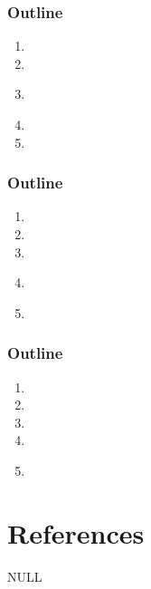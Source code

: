 \documentclass[usenames,dvipsnames]{beamer}
\begin{document}


\miniframesoff
\begin{frame}
  \frametitle{\textbf{ Outline}}
\begin{enumerate}
  \item \introtitle
  \item \firsttitle
  \item \textbf{\secondtitle}
  \item \thirdtitle
  \item \conclusiontitle
\end{enumerate}
\end{frame}
\miniframeson



\miniframesoff
\begin{frame}
  \frametitle{\textbf{ Outline}}
\begin{enumerate}
  \item \introtitle
  \item \firsttitle
  \item \secondtitle
  \item \textbf{\thirdtitle}
  \item \conclusiontitle
\end{enumerate}
\end{frame}
\miniframeson



\miniframesoff
\begin{frame}
  \frametitle{\textbf{ Outline}}
\begin{enumerate}
  \item \introtitle
  \item \firsttitle
  \item \secondtitle
  \item \thirdtitle
  \item \textbf{\conclusiontitle}
\end{enumerate}
\end{frame}
\miniframeson



\hypertarget{references}{%
\section{References}\label{references}}

NULL
\end{document}
